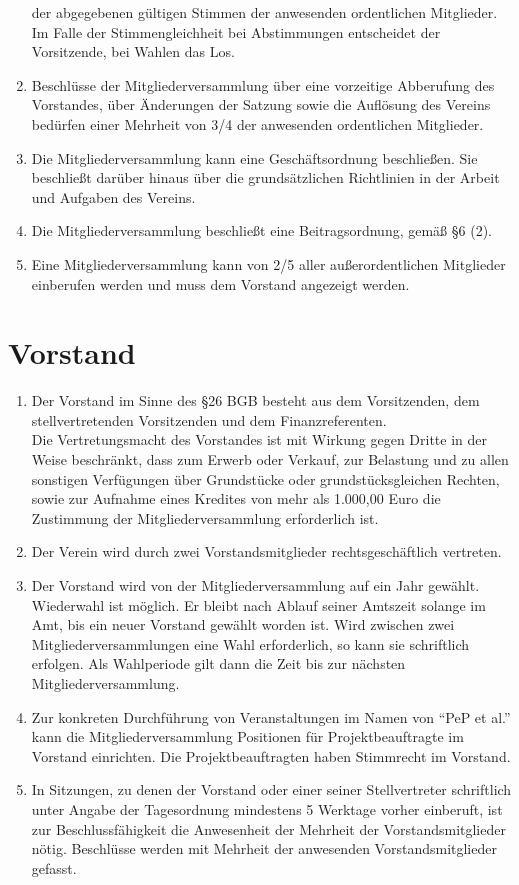 \documentclass[
  fontsize=12pt,
  paper=a4,
  DIV14,
  parskip,
]{scrartcl}
\begin{document}
\begin{enumerate}
		der abgegebenen gültigen Stimmen der anwesenden ordentlichen Mitglieder.
		Im Falle der Stimmengleichheit bei Abstimmungen entscheidet der Vorsitzende,
		bei Wahlen das Los.
	\item Beschlüsse der Mitgliederversammlung über eine vorzeitige Abberufung
		des Vorstandes, über Änderungen der Satzung sowie die Auflösung des Vereins
		bedürfen einer Mehrheit von 3/4 der anwesenden ordentlichen Mitglieder.
	\item Die Mitgliederversammlung kann eine Geschäftsordnung beschließen. Sie
		beschließt darüber hinaus über die grundsätzlichen Richtlinien in der
		Arbeit und Aufgaben des Vereins.
	\item Die Mitgliederversammlung beschließt eine Beitragsordnung, gemäß §6 (2).
	\item Eine Mitgliederversammlung kann von 2/5 aller außerordentlichen
		Mitglieder einberufen werden und muss dem Vorstand angezeigt werden.
\end{enumerate}

\section{Vorstand}

\begin{enumerate}
	\item Der Vorstand im Sinne des §26 BGB besteht aus dem Vorsitzenden, dem
		stellvertretenden Vorsitzenden und dem Finanzreferenten.\\
		Die Vertretungsmacht des Vorstandes ist mit Wirkung gegen Dritte in der
		Weise beschränkt, dass zum Erwerb oder Verkauf, zur Belastung und zu allen
		sonstigen Verfügungen über Grundstücke oder grundstücksgleichen Rechten,
		sowie zur Aufnahme eines Kredites von mehr als 1.000,00 Euro die Zustimmung
		der Mitgliederversammlung erforderlich ist.
	\item Der Verein wird durch zwei Vorstandsmitglieder rechtsgeschäftlich
		vertreten.
	\item Der Vorstand wird von der Mitgliederversammlung auf ein Jahr gewählt.
		Wiederwahl ist möglich. Er bleibt nach Ablauf seiner Amtszeit solange im
		Amt, bis ein neuer Vorstand gewählt worden ist. Wird zwischen zwei
		Mitgliederversammlungen eine Wahl erforderlich, so kann sie schriftlich
		erfolgen. Als Wahlperiode gilt dann die Zeit bis zur nächsten
		Mitgliederversammlung.
	\item Zur konkreten Durchführung von Veranstaltungen im Namen von \enquote{PeP
		et al.} kann die Mitgliederversammlung Positionen für
		Projektbeauftragte im Vorstand einrichten. Die Projektbeauftragten haben
		Stimmrecht im Vorstand.
	\item In Sitzungen, zu denen der Vorstand oder einer seiner Stellvertreter
		schriftlich unter Angabe der Tagesordnung mindestens 5 Werktage vorher
		einberuft, ist zur Beschlussfähigkeit die Anwesenheit der Mehrheit der
		Vorstandsmitglieder nötig. Beschlüsse werden mit Mehrheit der anwesenden
		Vorstandsmitglieder gefasst.
\end{enumerate}
\end{document}
